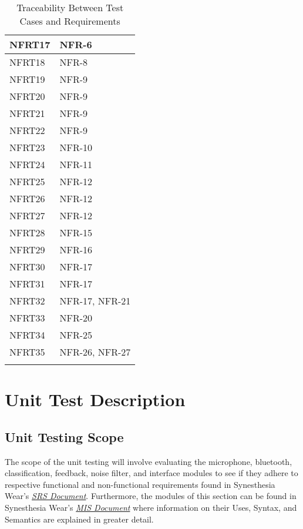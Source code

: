 \documentclass[12pt, titlepage]{article}
\begin{document}
\begin{longtable}{| p{} | p{} |}
  NFRT17 &  NFR-6  \\ \hline
  NFRT18 &  NFR-8  \\ \hline
  NFRT19 &   NFR-9 \\ \hline
  NFRT20 &  NFR-9  \\ \hline
  NFRT21 &  NFR-9  \\ \hline
  NFRT22&  NFR-9  \\ \hline
  NFRT23 &  NFR-10  \\ \hline
  NFRT24 &  NFR-11  \\ \hline
  NFRT25 &  NFR-12  \\ \hline
  NFRT26 &  NFR-12  \\ \hline
  NFRT27 &  NFR-12  \\ \hline
  NFRT28 &  NFR-15 \\ \hline
  NFRT29 &   NFR-16 \\ \hline
  NFRT30 &  NFR-17  \\ \hline
  NFRT31 &   NFR-17 \\ \hline
  NFRT32 &  NFR-17, NFR-21 \\ \hline
  NFRT33 &  NFR-20  \\ \hline
  NFRT34 &  NFR-25  \\ \hline
  NFRT35 &   NFR-26, NFR-27 \\ \hline
  \caption{Traceability Between Test Cases and Requirements} %
  \label{tab:myfirstlongtable}
  \end{longtable}
\section{Unit Test Description}

\subsection{Unit Testing Scope}
The scope of the unit testing will involve evaluating the microphone, bluetooth, 
classification, feedback, noise filter, and interface modules to see if they adhere 
to respective functional and non-functional requirements found in Synesthesia Wear’s 
\href{https://github.com/jordanbierbrier/capstone/blob/main/docs/SRS/SRS.pdf}{\textit{SRS Document}}.
Furthermore, the modules of this section can be found in Synesthesia Wear's 
\href{https://github.com/jordanbierbrier/capstone/blob/main/docs/Design/SoftDetailedDes/MIS.pdf}{\textit{MIS Document}}
where information on their Uses, Syntax, and Semantics are explained in greater detail.
\end{document}
